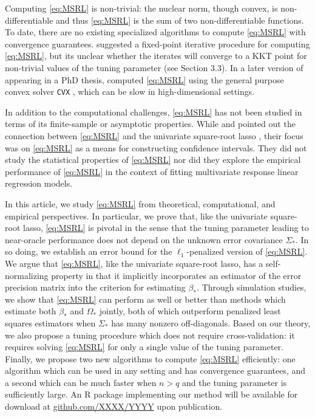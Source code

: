 \documentclass[12pt]{article}
\begin{document}
Computing \eqref{eq:MSRL} is non-trivial: the nuclear norm, though convex, is non-differentiable and thus \eqref{eq:MSRL} is the sum of two non-differentiable functions. To date, there are no existing specialized algorithms to compute \eqref{eq:MSRL} with convergence guarantees. \citet{van2016chi2} suggested a fixed-point iterative procedure for computing \eqref{eq:MSRL}, but its unclear whether the iterates will converge to a KKT point for non-trivial values of the tuning parameter (see Section 3.3). 
In a later version of \citet{van2016chi2} appearing in a PhD thesis, \citet{stucky2017asymptotic} computed \eqref{eq:MSRL} using the general purpose convex solver \texttt{CVX} \citep{cvx}, which can be slow in high-dimensional settings. 

In addition to the computational challenges, \eqref{eq:MSRL} has not been studied in terms of its finite-sample or asymptotic properties. While \citet{van2016chi2} and \citet{van2016estimation} pointed out the connection between \eqref{eq:MSRL} and the univariate square-root lasso \citep{belloni2011square}, their focus was on \eqref{eq:MSRL} as a means for constructing confidence intervals. They did not study the statistical properties of \eqref{eq:MSRL} nor did they explore the empirical performance of \eqref{eq:MSRL} in the context of fitting multivariate response linear regression models. 

In this article, we study \eqref{eq:MSRL} from theoretical, computational, and empirical perspectives. In particular, we prove that, like the univariate square-root lasso, \eqref{eq:MSRL} is pivotal in the sense that the tuning parameter leading to near-oracle performance does not depend on the unknown error covariance $\Sigma_*$. In so doing, we establish an error bound for the $\ell_1$-penalized version of \eqref{eq:MSRL}. We argue that \eqref{eq:MSRL}, like the univariate square-root lasso, has a self-normalizing property in that it implicitly incorporates an estimator of the error precision matrix into the criterion for estimating $\beta_*$. 
Through simulation studies, we show that \eqref{eq:MSRL} can perform as well or better than methods which estimate both $\beta_*$ and $\Omega_*$ jointly, both of which outperform penalized least squares estimators when $\Sigma_*$ has many nonzero off-diagonals. Based on our theory, we also propose a tuning procedure which does not require cross-validation: it requires solving \eqref{eq:MSRL} for only a single value of the tuning parameter. Finally, we propose two new algorithms to compute \eqref{eq:MSRL} efficiently: one algorithm which can be used in any setting and has convergence guarantees, and a second which can be much faster when $n > q$ and the tuning parameter is sufficiently large. An R package implementing our method will be available for download at \href{http://github.com/XXXX/YYYY}{github.com/XXXX/YYYY} upon publication. 
\end{document}
